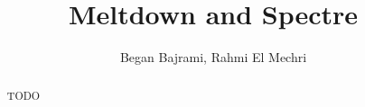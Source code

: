 \documentclass[10pt, a4paper, twocolumn]{article}
\title{Meltdown and Spectre}
\author{Began Bajrami, Rahmi El Mechri}
\begin{document}
\maketitle
\begin{abstract}
   TODO 
\end{abstract}












\end{document}

